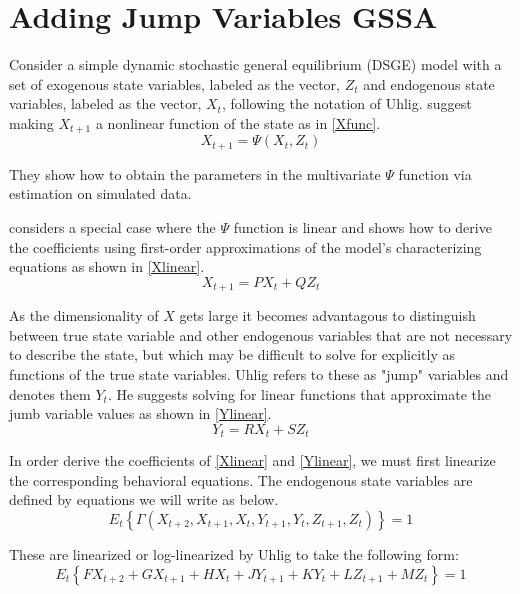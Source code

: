 \documentclass[letterpaper,12pt]{article}
\begin{document}
\section{Adding Jump Variables GSSA}

\begin{spacing}{1.5}

Consider a simple dynamic stochastic general equilibrium (DSGE) model with a set of exogenous state variables, labeled as the vector, $Z_t$ and endogenous state variables, labeled as the vector, $X_t$, following the notation of Uhlig.  \citet{JuddMaliarMaliar:2011} suggest making $X_{t+1}$ a nonlinear function of the state as in \eqref{Xfunc}.
\begin{equation} \label{Xfunc}
	X_{t+1} = \Psi(X_{t},Z_{t})
\end{equation}

They show how to obtain the parameters in the multivariate $\Psi$ function via estimation on simulated data.

\citet{Uhlig:1999} considers a special case where the $\Psi$ function is linear and shows how to derive the coefficients using first-order approximations of the model's characterizing equations as shown in \eqref{Xlinear}.
\begin{equation} \label{Xlinear}
	X_{t+1} =P X_{t} + Q Z_{t}
\end{equation}

As the dimensionality of $X$ gets large it becomes advantagous to distinguish between true state variable and other endogenous variables that are not necessary to describe the state, but which may be difficult to solve for explicitly as functions of the true state variables.  Uhlig refers to these as "jump" variables and denotes them $Y_t$.  He suggests solving for linear functions that approximate the jumb variable values as shown in \eqref{Ylinear}.
\begin{equation} \label{Ylinear}
	Y_{t} =R X_{t} + S Z_{t}
\end{equation}

In order derive the coefficients of \eqref{Xlinear} and \eqref{Ylinear}, we must first linearize the corresponding behavioral equations.  The endogenous state variables are defined by equations we will write as below.
\begin{equation} \label{XEulers}
	E_t\left\{\Gamma(X_{t+2},X_{t+1},X_{t},Y_{t+1},Y_{t},Z_{t+1},Z_{t})\right\}=1
\end{equation}

These are linearized or log-linearized by Uhlig to take the following form:
\begin{equation}\label{XEulerslinear}
	E_t\left\{F X_{t+2} + G X_{t+1} + H X_{t} + J Y_{t+1} + K Y_{t} + L Z_{t+1} + M Z_{t}\right\}= 1
\end{equation}


\end{spacing}
\end{document}
